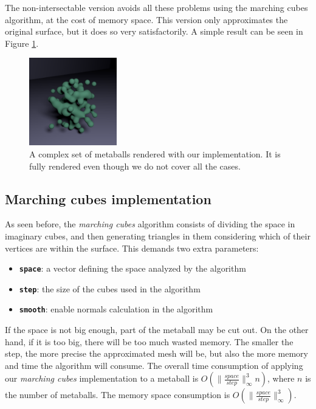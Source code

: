 \documentclass[conference]{acmsiggraph}
\begin{document}
The non-intersectable version avoids all these problems using the marching cubes
algorithm, at the cost of memory space. This version only approximates the original
surface, but it does so very satisfactorily. A simple result can be seen in Figure
\ref{img:marching-cubes}.

\begin{figure}[ht]
  \centering
  \includegraphics[width=1.5in]{images/blob.png}
  \caption{A complex set of metaballs rendered with our implementation. It is
           fully rendered even though we do not cover all the cases.}
  \label{img:marching-cubes}
\end{figure}

\subsection{Marching cubes implementation}

As seen before, the \textit{marching cubes} algorithm consists of dividing the
space in imaginary cubes, and then generating triangles in them considering
which of their vertices are within the surface. This demands two extra
parameters:

\begin{itemize}
  \item \textbf{\texttt{space}}: a vector defining the space analyzed by the algorithm
  \item \textbf{\texttt{step}}: the size of the cubes used in the algorithm
  \item \textbf{\texttt{smooth}}: enable normals calculation in the algorithm
\end{itemize}

If the space is not big enough, part of the metaball may be cut out. On the
other hand, if it is too big, there will be too much wasted memory. The smaller
the step, the more precise the approximated mesh will be, but also the more
memory and time the algorithm will consume. The overall time consumption of
applying our \textit{marching cubes} implementation to a metaball is
$O(\|\frac{space}{step}\|_\infty^3 n)$, where $n$ is the number of metaballs.
The memory space consumption is $O(\|\frac{space}{step}\|_\infty^3)$.
\end{document}
